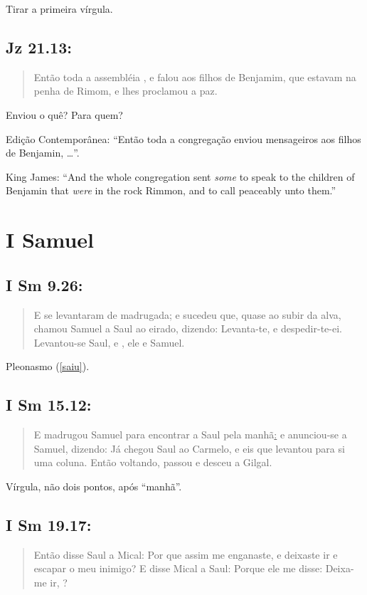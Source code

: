Tirar a primeira vírgula.

\subsection*{Jz 21.13:} \label{enviar}
\begin{quote}
    \small
    Então toda a assembléia , e falou aos filhos de Benjamim, que estavam na penha de Rimom, e lhes proclamou a paz.
\end{quote}

Enviou o quê? Para quem?

Edição Contemporânea: ``Então toda a congregação enviou mensageiros aos filhos de Benjamin, \ldots''.

King James: ``And the whole congregation sent \emph{some} to speak to the
children of Benjamin that \emph{were} in the rock Rimmon, and to call
peaceably unto them.''

\section{I Samuel}
\subsection*{I Sm 9.26:} 
\begin{quote}
    \small
E se levantaram de madrugada; e sucedeu que, quase ao subir da alva, chamou Samuel a Saul ao eirado, dizendo: Levanta-te, e despedir-te-ei. Levantou-se Saul, e , ele e Samuel.
\end{quote}

Pleonasmo (\ref{saiu}).

\subsection*{I Sm 15.12:} 
\begin{quote}
    \small
E madrugou Samuel para encontrar a Saul pela manhã\uline{:} e anunciou-se a Samuel, dizendo: Já chegou Saul ao Carmelo, e eis que levantou para si uma coluna. Então voltando, passou e desceu a Gilgal.
\end{quote}

Vírgula, não dois pontos, após ``manhã''.

\subsection*{I Sm 19.17:} 
\begin{quote}
    \small
Então disse Saul a Mical: Por que assim me enganaste, e deixaste ir e escapar o meu inimigo? E disse Mical a Saul: Porque ele me disse: Deixa-me ir, ?
\end{quote}

